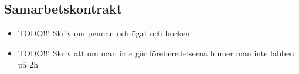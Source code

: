 

\subsection*{Samarbetskontrakt}
 
\begin{itemize}
\item TODO!!! Skriv om pennan och ögat och bocken
\item TODO!!! Skriv att om man inte gör föreberedelserna hinner man inte labben på 2h
\end{itemize}
